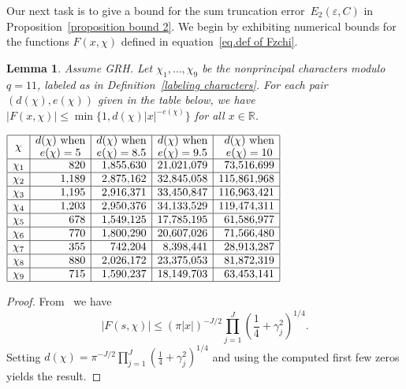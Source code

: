\documentclass[11pt]{article}
\theoremstyle{plain}
\newtheorem{lemma}[thm]{Lemma}
\theoremstyle{definition}
\numberwithin{equation}{section}
\newcommand{\R}{\mathbb R}
\newcommand{\0}{{\vec 0}}
\begin{document}
Our next task is to give a bound for the sum truncation error~$E_2(\varepsilon,C)$ in Proposition~\ref{proposition bound 2}. We begin by exhibiting numerical bounds for the functions $F(x,\chi)$ defined in equation~\eqref{eq.def of Fzchi}.

\begin{lemma} \label{dchi and echi lemma}
Assume GRH. Let $\chi_1,\dots,\chi_9$ be the nonprincipal characters modulo $q=11$, labeled as in Definition~\ref{labeling characters}. For each pair $(d(\chi),e(\chi))$ given in the table below, we have $|F(x,\chi)| \le \min\{1,d(\chi)|x|^{-e(\chi)} \}$ for all $x\in\R$.
\begin{center}$
\begin{array}{|c|r|r|r|r|}
\hline
\chi & \substack{\textstyle d(\chi)\text{ when} \\ \textstyle e(\chi)=5} & \substack{\textstyle d(\chi)\text{ when} \\ \textstyle e(\chi)=8.5} & \substack{\textstyle d(\chi)\text{ when} \\ \textstyle e(\chi)=9.5} & \substack{\textstyle d(\chi)\text{ when} \\ \textstyle e(\chi)=10} \\ \hline
\chi_1 & 820 & 1{,}855{,}630 & 21{,}021{,}079 & 73{,}516{,}699 \\ \hline
\chi_2 & 1{,}189 & 2{,}875{,}162 & 32{,}845{,}058 & 115{,}861{,}968 \\ \hline
\chi_3 & 1{,}195 & 2{,}916{,}371 & 33{,}450{,}847 & 116{,}963{,}421 \\ \hline
\chi_4 & 1{,}203 & 2{,}950{,}376 & 34{,}133{,}529 & 119{,}474{,}311 \\ \hline
\chi_5 & 678 & 1{,}549{,}125 & 17{,}785{,}195 & 61{,}586{,}977 \\ \hline
\chi_6 & 770 & 1{,}800{,}290 & 20{,}607{,}026 & 71{,}566{,}480 \\ \hline
\chi_7 & 355 & 742{,}204 & 8{,}398{,}441 & 28{,}913{,}287 \\ \hline
\chi_8 & 880 & 2{,}026{,}172 & 23{,}375{,}053 & 81{,}872{,}319 \\ \hline
\chi_9 & 715 & 1{,}590{,}237 & 18{,}149{,}703 & 63{,}453{,}141 \\ \hline
\end{array}
$\end{center}
\end{lemma}

\begin{proof}
From~\cite[equation~(2-16)]{BSRPNR} we have
\[|F(s,\chi)|\le \left(\pi |x|\right)^{-J/2}\prod\limits_{j=1}^J \left(\frac{1}{4}+\gamma_j^2\right)^{1/4}.\]
Setting $d(\chi)=\pi^{-J/2}\prod\limits_{j=1}^J \left(\frac{1}{4}+\gamma_j^2\right)^{1/4}$ and using the computed first few zeros yields the result.
\end{proof}
\end{document}
